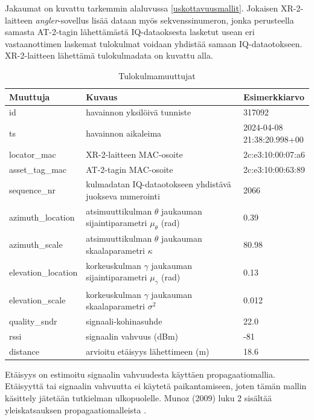 \documentclass[
  12pt,
  a4paper, twoside]{book}
\begin{document}
Jakaumat on kuvattu tarkemmin alaluvussa \ref{uskottavuusmallit}. Jokaisen XR-2-laitteen \emph{angler}-sovellus lisää dataan myös sekvenssinumeron, jonka perusteella samasta AT-2-tagin lähettämästä IQ-dataoksesta lasketut usean eri vastaanottimen laskemat tulokulmat voidaan yhdistää samaan IQ-dataotokseen. XR-2-laitteen lähettämä tulokulmadata on kuvattu alla.

\def\arraystretch{1.25} 
\begin{table}[H]
\centering
\begin{tabular}{|l|l|l|}
\hline
Muuttuja & Kuvaus & Esimerkkiarvo\\
\hline
id & havainnon yksilöivä tunniste & 317092 \\
ts & havainnon aikaleima & \makecell[l]{2024-04-08 \\ 21:38:20.998+00}\\
locator\_mac & XR-2-laitteen MAC-osoite & 2c:e3:10:00:07:a6
\\
asset\_tag\_mac & AT-2-tagin MAC-osoite & 2c:e3:10:00:63:89\\
sequence\_nr & \makecell[l]{kulmadatan IQ-dataotokseen yhdistävä \\ juokseva numerointi} & 2066\\
azimuth\_location & \makecell[l]{atsimuuttikulman $\theta$ \\ jaukauman sijaintiparametri $\mu_{\theta}$ (rad)} & 0.39
\\
azimuth\_scale & \makecell[l]{atsimuuttikulman $\theta$ \\ jaukauman skaalaparametri $\kappa$} & 80.98
\\
elevation\_location & \makecell[l]{korkeuskulman $\gamma$ \\ jaukauman sijaintiparametri $\mu_{\gamma}$ (rad)} & 0.13
\\
elevation\_scale & \makecell[l]{korkeuskulman $\gamma$ \\ jaukauman skaalaparametri $\sigma^2$} & 0.012
\\
quality\_sndr & signaali-kohinasuhde & 22.0 \\
rssi & signaalin vahvuus (dBm) & -81\\
distance & arvioitu etäisyys lähettimeen (m) & 18.6\\
\hline
\end{tabular}
\caption{Tulokulmamuuttujat}
\label{tab:aoa-muuttujat}
\end{table}

Etäisyys on estimoitu signaalin vahvuudesta käyttäen propagaatiomallia. Etäisyyttä tai signaalin vahvuutta ei käytetä paikantamiseen, joten tämän mallin käsittely jätetään tutkielman ulkopuolelle. Munoz (2009) luku 2 sisältää yleiskatsauksen propagaatiomalleista \citep{Munoz-2009}.
\end{document}
